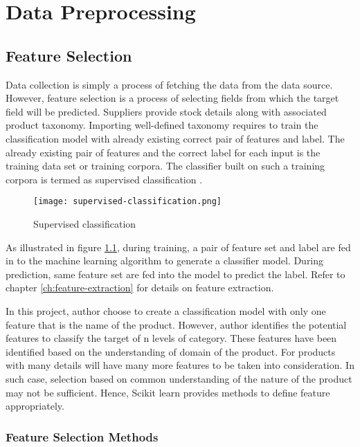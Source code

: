 \chapter{Data Preprocessing}

\section{Feature Selection}

Data collection is simply a process of fetching the data from the data source. However, feature selection is a process of selecting fields from which the target field will be predicted. Suppliers provide stock details along with associated product taxonomy. Importing well-defined taxonomy requires to train the classification model with already existing correct pair of features and label. The already existing pair of features and the correct label for each input is the training data set or training corpora. The classifier built on such a training corpora is termed as supervised classification \parencite{BirdKleinLoper09}.

\begin{figure}[H]
      \centering    
      \texttt{[image: supervised-classification.png]}
      \caption{Supervised classification \parencite{BirdKleinLoper09}}
      \label{fig:supervised-classification}
  \end{figure}

  As illustrated in figure \ref{fig:supervised-classification}, during training, a pair of feature set and label are fed in to the machine learning algorithm to generate a classifier model. During prediction, same feature set are fed into the model to predict the label. Refer to chapter \ref{ch:feature-extraction} for details on feature extraction.

In this project, author choose to create a classification model with only one feature that is the name of the product. However, author identifies the potential features to classify the target of n levels of category. These features have been identified based on the understanding of domain of the product. For products with many details will have many more features to be taken into consideration. In such case, selection based on common understanding of the nature of the product may not be sufficient. Hence, Scikit learn  \parencite{sklearn_api} provides methods to define feature appropriately. 


\subsection {Feature Selection Methods} \label{sec:feature-selection}

